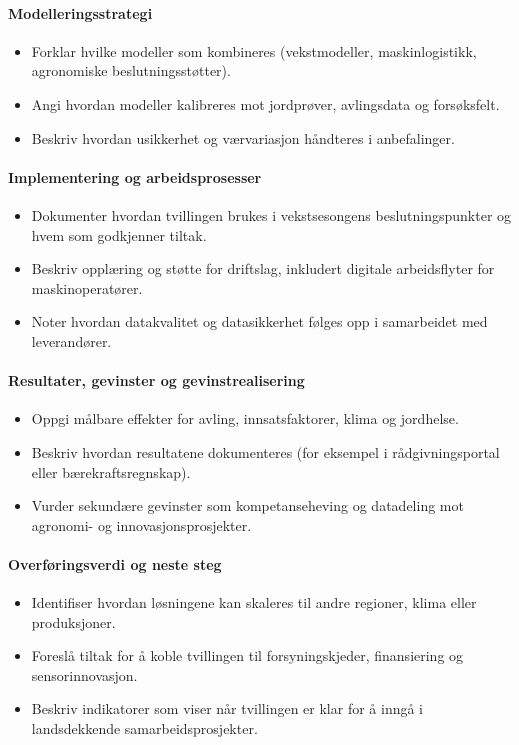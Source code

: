 \paragraph{Modelleringsstrategi}
\begin{itemize}
    \item Forklar hvilke modeller som kombineres (vekstmodeller, maskinlogistikk, agronomiske beslutningsstøtter).
    \item Angi hvordan modeller kalibreres mot jordprøver, avlingsdata og forsøksfelt.
    \item Beskriv hvordan usikkerhet og værvariasjon håndteres i anbefalinger.
\end{itemize}

\paragraph{Implementering og arbeidsprosesser}
\begin{itemize}
    \item Dokumenter hvordan tvillingen brukes i vekstsesongens beslutningspunkter og hvem som godkjenner tiltak.
    \item Beskriv opplæring og støtte for driftslag, inkludert digitale arbeidsflyter for maskinoperatører.
    \item Noter hvordan datakvalitet og datasikkerhet følges opp i samarbeidet med leverandører.
\end{itemize}

\paragraph{Resultater, gevinster og gevinstrealisering}
\begin{itemize}
    \item Oppgi målbare effekter for avling, innsatsfaktorer, klima og jordhelse.
    \item Beskriv hvordan resultatene dokumenteres (for eksempel i rådgivningsportal eller bærekraftsregnskap).
    \item Vurder sekundære gevinster som kompetanseheving og datadeling mot agronomi- og innovasjonsprosjekter.
\end{itemize}

\paragraph{Overføringsverdi og neste steg}
\begin{itemize}
    \item Identifiser hvordan løsningene kan skaleres til andre regioner, klima eller produksjoner.
    \item Foreslå tiltak for å koble tvillingen til forsyningskjeder, finansiering og sensorinnovasjon.
    \item Beskriv indikatorer som viser når tvillingen er klar for å inngå i landsdekkende samarbeidsprosjekter.
\end{itemize}


